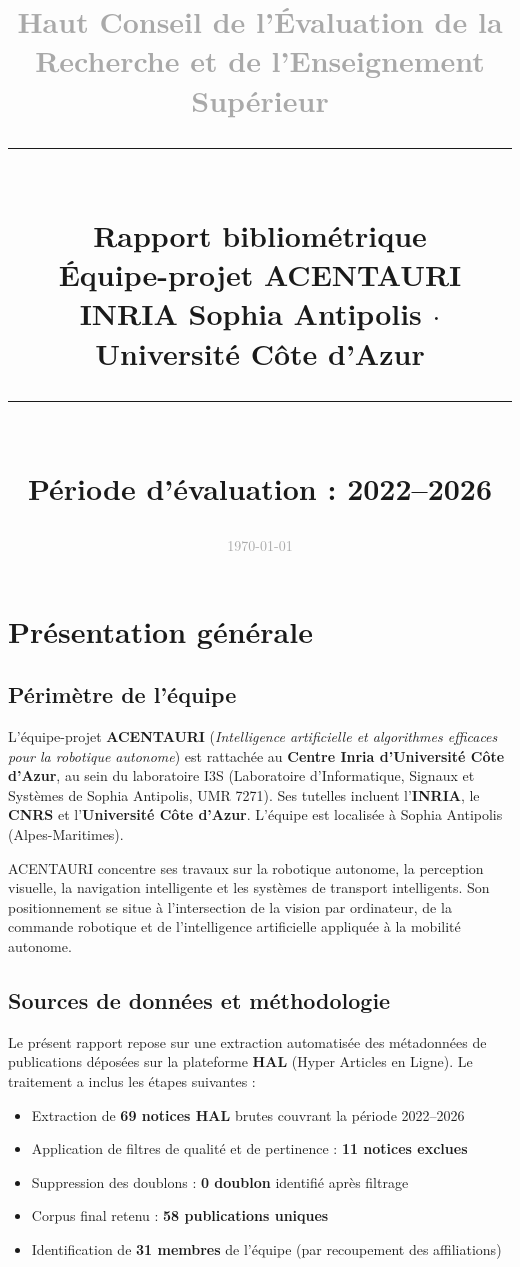 \documentclass[a4paper,11pt]{article}
\title{
  \vspace{-1cm}
  {\large\textcolor{darkgray}{Haut Conseil de l'Évaluation de la Recherche et de l'Enseignement Supérieur}}\\[0.3cm]
  \rule{\textwidth}{1.5pt}\\[0.4cm]
  {\LARGE\bfseries Rapport bibliométrique}\\[0.2cm]
  {\LARGE\bfseries\textcolor{inriablue}{Équipe-projet ACENTAURI}}\\[0.3cm]
  {\large INRIA Sophia Antipolis $\cdot$ Université Côte d'Azur}\\[0.2cm]
  \rule{\textwidth}{1.5pt}\\[0.3cm]
  {\normalsize Période d'évaluation : 2022--2026}
}
\author{}
\date{\textcolor{darkgray}{\today}}
\begin{document}
\maketitle
\thispagestyle{fancy}

\tableofcontents
\newpage

\section{Présentation générale}

\subsection{Périmètre de l'équipe}

L'équipe-projet \textbf{ACENTAURI} (\textit{Intelligence artificielle et algorithmes efficaces pour la robotique autonome}) est rattachée au \textbf{Centre Inria d'Université Côte d'Azur}, au sein du laboratoire I3S (Laboratoire d'Informatique, Signaux et Systèmes de Sophia Antipolis, UMR 7271). Ses tutelles incluent l'\textbf{INRIA}, le \textbf{CNRS} et l'\textbf{Université Côte d'Azur}. L'équipe est localisée à Sophia Antipolis (Alpes-Maritimes).

ACENTAURI concentre ses travaux sur la robotique autonome, la perception visuelle, la navigation intelligente et les systèmes de transport intelligents. Son positionnement se situe à l'intersection de la vision par ordinateur, de la commande robotique et de l'intelligence artificielle appliquée à la mobilité autonome.

\subsection{Sources de données et méthodologie}

Le présent rapport repose sur une extraction automatisée des métadonnées de publications déposées sur la plateforme \textbf{HAL} (Hyper Articles en Ligne). Le traitement a inclus les étapes suivantes :

\begin{itemize}[nosep]
  \item Extraction de \textbf{69 notices HAL} brutes couvrant la période 2022--2026
  \item Application de filtres de qualité et de pertinence : \textbf{11 notices exclues}
  \item Suppression des doublons : \textbf{0 doublon} identifié après filtrage
  \item Corpus final retenu : \textbf{58 publications uniques}
  \item Identification de \textbf{31 membres} de l'équipe (par recoupement des affiliations)
\end{itemize}
\end{document}
